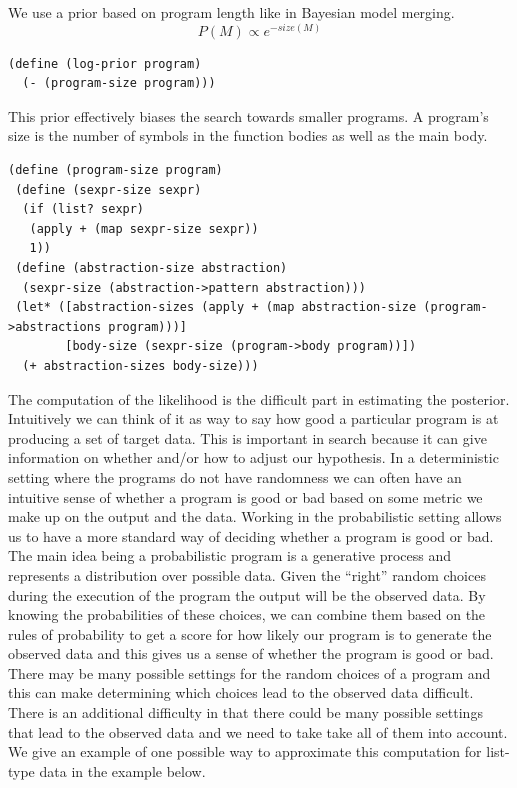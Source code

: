 \documentclass[a4paper,10pt]{article}
\begin{document}
We use a prior based on program length like in Bayesian model merging.  
\begin{equation}P(M)\propto e^{-size(M)}\end{equation}
\begin{verbatim}
(define (log-prior program)
  (- (program-size program)))
\end{verbatim}
This prior effectively biases the search towards smaller programs.  A program's size is the number of symbols in the function bodies as well as the main body.
\begin{verbatim}
(define (program-size program)
 (define (sexpr-size sexpr)
  (if (list? sexpr)
   (apply + (map sexpr-size sexpr))
   1))
 (define (abstraction-size abstraction)
  (sexpr-size (abstraction->pattern abstraction)))
 (let* ([abstraction-sizes (apply + (map abstraction-size (program->abstractions program)))]
        [body-size (sexpr-size (program->body program))])
  (+ abstraction-sizes body-size)))
\end{verbatim}
The computation of the likelihood is the difficult part in estimating the posterior.  Intuitively we can think of it as way to say how good a particular program is at producing a set of target data.  This is important in search because it can give information on whether and/or how to adjust our hypothesis.  In a deterministic setting where the programs do not have randomness we can often have an intuitive sense of whether a program is good or bad based on some metric we make up on the output and the data.  Working in the probabilistic setting allows us to have a more standard way of deciding whether a program is good or bad.  The main idea being a probabilistic program is a generative process and represents a distribution over possible data.  Given the ``right'' random choices during the execution of the program the output will be the observed data.  By knowing the probabilities of these choices, we can combine them based on the rules of probability to get a score for how likely our program is to generate the observed data and this gives us a sense of whether the program is good or bad.  There may be many possible settings for the random choices of a program and this can make determining which choices lead to the observed data difficult.  There is an additional difficulty in that there could be many possible settings that lead to the observed data and we need to take take all of them into account.  We give an example of one possible way to approximate this computation for list-type data in the example below.
\end{document}
